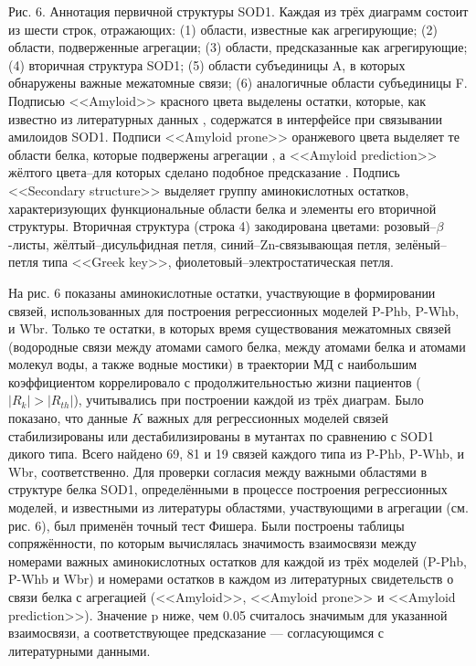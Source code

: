 Рис. 6. Аннотация первичной структуры SOD1. Каждая из трёх диаграмм состоит из шести строк, отражающих: (1) области, известные как агрегирующие; (2) области, подверженные агрегации; (3) области, предсказанные как агрегирующие; (4) вторичная структура SOD1; (5) области субъединицы A, в которых обнаружены важные межатомные связи; (6) аналогичные области субъединицы F. Подписью <<Amyloid>> красного цвета выделены остатки, которые, как известно из литературных данных \cite{Elam2003,Wright2013,Banci2009,Antonyuk2005}, содержатся в интерфейсе при связывании амилоидов SOD1. Подписи <<Amyloid prone>> оранжевого цвета выделяет те области белка, которые подвержены агрегации \cite{Durazo2009}, а <<Amyloid prediction>> жёлтого цвета--для которых сделано подобное предсказание \cite{Wright2013}. Подпись <<Secondary structure>> выделяет группу аминокислотных остатков, характеризующих функциональные области белка и элементы его вторичной структуры. Вторичная структура (строка 4) закодирована цветами: розовый--$\beta$-листы, жёлтый--дисульфидная петля, синий--Zn-связывающая петля, зелёный--петля типа <<Greek key>>, фиолетовый--электростатическая петля.

На рис. 6 показаны аминокислотные остатки, участвующие в формировании связей, использованных для построения регрессионных моделей P-Phb, P-Whb, и Wbr. Только те остатки, в которых время существования межатомных связей (водородные связи между атомами самого белка, между атомами белка и атомами молекул воды, а также водные мостики) в траектории МД с наибольшим коэффициентом коррелировало с продолжительностью жизни пациентов ($|R_k| > |R_{th}|$), учитывались при построении каждой из трёх диаграм. Было показано, что данные $K$ важных для регрессионных моделей связей стабилизированы или дестабилизированы в мутантах по сравнению с SOD1 дикого типа. Всего найдено 69, 81 и 19 связей каждого типа из P-Phb, P-Whb, и Wbr, соответственно.
Для проверки согласия между важными областями в структуре белка SOD1, определёнными в процессе построения регрессионных моделей, и известными из литературы областями, участвующими в агрегации (см. рис. 6), был применён точный тест Фишера. Были построены таблицы сопряжённости, по которым вычислялась значимость взаимосвязи между номерами важных аминокислотных остатков для каждой из трёх моделей (P-Phb, P-Whb и Wbr) и номерами остатков в каждом из литературных свидетельств о связи белка с агрегацией (<<Amyloid>>, <<Amyloid prone>> и <<Amyloid prediction>>). Значение p ниже, чем 0.05 считалось значимым для указанной взаимосвязи, а соответствующее предсказание — согласующимся с литературными данными. 

